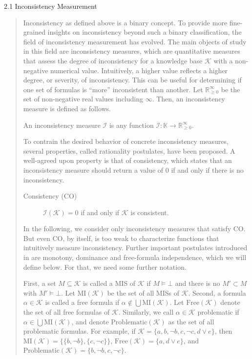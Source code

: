 2.1 Inconsistency Measurement
\begin{quotation}
    Inconsistency as defined above is a binary concept. To provide more fine-grained insights on inconsistency beyond such a binary classification, the field of inconsistency measurement \cite{Thimm2019} has evolved. The main objects of study in this field are inconsistency measures, which are quantitative measures that assess the degree of inconsistency for a knowledge base $\mathcal{K}$ with a non-negative numerical value. Intuitively, a higher value reflects a higher degree, or severity, of inconsistency. This can be useful for determining if one set of formulas is ``more'' inconsistent than another. Let $\mathbb{R}_{\geq 0}^\infty$ be the set of non-negative real values including $\infty$. Then, an inconsistency measure is defined as follows.

    \begin{defn}
        An inconsistency measure $\mathcal{I}$ is any function $\mathcal{I} : \mathbb{K} \rightarrow \mathbb{R}_{\geq 0}^\infty$.
    \end{defn}

    To contrain the desired behavior of concrete inconsistency measures, several properties, called rationality postulates, have been proposed. A well-agreed upon property is that of consistency, which states that an inconsistency measure should return a value of 0 if and only if there is no inconsistency.

    \begin{description}
        \item[Consistency (CO)] $\mathcal{I}(\mathcal{K}) = 0$ if and only if $\mathcal{K}$ is consistent.
    \end{description}

    In the following, we consider only inconsistency measures that satisfy CO. But even CO, by itself, is too weak to characterize functions that intuitively measure inconsistency. Further important postulates introduced in \cite{Hunter2006} are monotony, dominance and free-formula independence, which we will define below. For that, we need some further notation.

    First, a set $M \subseteq \mathcal{K}$ is called a \ac{MIS} of $\mathcal{K}$ if $M \models \bot$ and there is no $M' \subset M$ with $M' \models \bot$. Let $\text{MI}(\mathcal{K})$ be the set of all \ac{MIS}s of $\mathcal{K}$. Second, a formula $\alpha \in \mathcal{K}$ is called a free formula if $\alpha \notin \bigcup \text{MI}(\mathcal{K})$. Let $\text{Free}(\mathcal{K})$ denote the set of all free formulas of $\mathcal{K}$. Similarly, we call $\alpha \in \mathcal{K}$ problematic if $\alpha \in \bigcup \text{MI}(\mathcal{K})$, and denote $\text{Problematic}(\mathcal{K})$ as the set of all problematic formulas. For example, if $\mathcal{K} = \{a, b, \neg b, c, \neg c, d \lor e\}$, then $\text{MI}(\mathcal{K}) = \{\{b, \neg b\}, \{c, \neg c\}\}$, $\text{Free}(\mathcal{K}) = \{a, d \lor e\}$, and $\text{Problematic}(\mathcal{K}) = \{b, \neg b, c, \neg c\}$.


\end{quotation}

